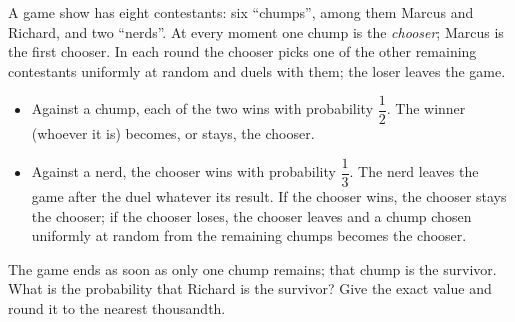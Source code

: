 A game show has eight contestants: six ``chumps'', among them Marcus and Richard, and two ``nerds''. At every moment one chump is the \emph{chooser}; Marcus is the first chooser. In each round the chooser picks one of the other remaining contestants uniformly at random and duels with them; the loser leaves the game.
\begin{itemize}
\item Against a chump, each of the two wins with probability $\dfrac{1}{2}$. The winner (whoever it is) becomes, or stays, the chooser.
\item Against a nerd, the chooser wins with probability $\dfrac{1}{3}$. The nerd leaves the game after the duel whatever its result. If the chooser wins, the chooser stays the chooser; if the chooser loses, the chooser leaves and a chump chosen uniformly at random from the remaining chumps becomes the chooser.
\end{itemize}
The game ends as soon as only one chump remains; that chump is the survivor. What is the probability that Richard is the survivor? Give the exact value and round it to the nearest thousandth.

